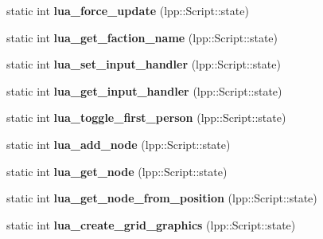 \begin{DoxyCompactItemize}
\item 
static int {\bfseries lua\+\_\+force\+\_\+update} (lpp\+::\+Script\+::state)\hypertarget{class_lua_interface_a32651720c29e160c4bff1dd7420124a3}{}\label{class_lua_interface_a32651720c29e160c4bff1dd7420124a3}

\item 
static int {\bfseries lua\+\_\+get\+\_\+faction\+\_\+name} (lpp\+::\+Script\+::state)\hypertarget{class_lua_interface_a261164b8db5fd91bdf8ef50a5a0e6a98}{}\label{class_lua_interface_a261164b8db5fd91bdf8ef50a5a0e6a98}

\item 
static int {\bfseries lua\+\_\+set\+\_\+input\+\_\+handler} (lpp\+::\+Script\+::state)\hypertarget{class_lua_interface_a79366e9b2486a2c90393de15d736a1a7}{}\label{class_lua_interface_a79366e9b2486a2c90393de15d736a1a7}

\item 
static int {\bfseries lua\+\_\+get\+\_\+input\+\_\+handler} (lpp\+::\+Script\+::state)\hypertarget{class_lua_interface_ad224f775da0c188cfea3b263a8b92c0f}{}\label{class_lua_interface_ad224f775da0c188cfea3b263a8b92c0f}

\item 
static int {\bfseries lua\+\_\+toggle\+\_\+first\+\_\+person} (lpp\+::\+Script\+::state)\hypertarget{class_lua_interface_a2a4853c99a71497966719c02b35ddae4}{}\label{class_lua_interface_a2a4853c99a71497966719c02b35ddae4}

\item 
static int {\bfseries lua\+\_\+add\+\_\+node} (lpp\+::\+Script\+::state)\hypertarget{class_lua_interface_a715ace611a7febd5cd76d58cf21c701c}{}\label{class_lua_interface_a715ace611a7febd5cd76d58cf21c701c}

\item 
static int {\bfseries lua\+\_\+get\+\_\+node} (lpp\+::\+Script\+::state)\hypertarget{class_lua_interface_a6a532f8e34760f99f584afce19e5c77c}{}\label{class_lua_interface_a6a532f8e34760f99f584afce19e5c77c}

\item 
static int {\bfseries lua\+\_\+get\+\_\+node\+\_\+from\+\_\+position} (lpp\+::\+Script\+::state)\hypertarget{class_lua_interface_a83548dc56a7de2d491d97f2e7aba70dd}{}\label{class_lua_interface_a83548dc56a7de2d491d97f2e7aba70dd}

\item 
static int {\bfseries lua\+\_\+create\+\_\+grid\+\_\+graphics} (lpp\+::\+Script\+::state)\hypertarget{class_lua_interface_a42d30ddb1ebd92661b8fd44a81793c13}{}\label{class_lua_interface_a42d30ddb1ebd92661b8fd44a81793c13}


\end{DoxyCompactItemize}
